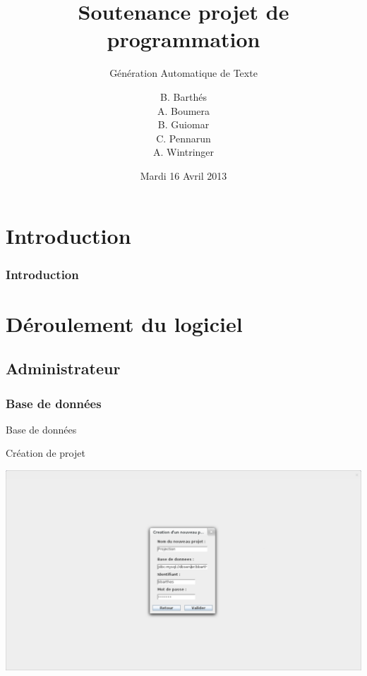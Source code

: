 \documentclass[8pt]{beamer}
\title{Soutenance projet de programmation}
\subtitle{Génération Automatique de Texte}
\author{B. Barthés \\ A. Boumera \\ B. Guiomar \\ C. Pennarun \\ A. Wintringer}
\date{Mardi 16 Avril 2013}
\begin{document}
 
\begin{frame}
\titlepage
\end{frame}

\section*{Introduction}
\begin{frame}\frametitle{Introduction}
\end{frame}


\section{Déroulement du logiciel}

\subsection{Administrateur}

\subsubsection{Base de données}
\begin{frame}{Base de données}
\begin{block}{Création de projet}
\begin{center}
\includegraphics[scale=0.2]{db_connection.png}
\end{center}
\end{block}
\end{frame}
\end{document}
